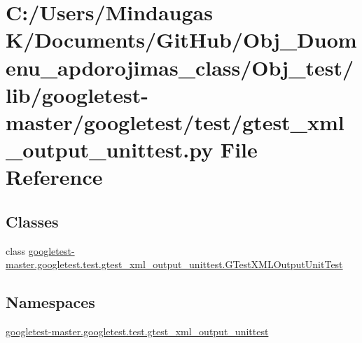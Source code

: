 \hypertarget{_obj__test_2lib_2googletest-master_2googletest_2test_2gtest__xml__output__unittest_8py}{}\section{C\+:/\+Users/\+Mindaugas K/\+Documents/\+Git\+Hub/\+Obj\+\_\+\+Duomenu\+\_\+apdorojimas\+\_\+class/\+Obj\+\_\+test/lib/googletest-\/master/googletest/test/gtest\+\_\+xml\+\_\+output\+\_\+unittest.py File Reference}
\label{_obj__test_2lib_2googletest-master_2googletest_2test_2gtest__xml__output__unittest_8py}
\subsection*{Classes}
\begin{DoxyCompactItemize}
\item 
class \mbox{\hyperlink{classgoogletest-master_1_1googletest_1_1test_1_1gtest__xml__output__unittest_1_1_g_test_x_m_l_output_unit_test}{googletest-\/master.\+googletest.\+test.\+gtest\+\_\+xml\+\_\+output\+\_\+unittest.\+G\+Test\+X\+M\+L\+Output\+Unit\+Test}}
\end{DoxyCompactItemize}
\subsection*{Namespaces}
\begin{DoxyCompactItemize}
\item 
 \mbox{\hyperlink{namespacegoogletest-master_1_1googletest_1_1test_1_1gtest__xml__output__unittest}{googletest-\/master.\+googletest.\+test.\+gtest\+\_\+xml\+\_\+output\+\_\+unittest}}
\end{DoxyCompactItemize}
